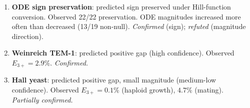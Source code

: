 \documentclass[10pt]{article}
\begin{document}
\begin{enumerate}
\item \textbf{ODE sign preservation}: predicted sign preserved under
  Hill-function conversion. Observed 22/22 preservation. ODE
  magnitudes increased more often than decreased (13/19 non-null).
  \emph{Confirmed} (sign); \emph{refuted} (magnitude direction).

\item \textbf{Weinreich TEM-1}: predicted positive gap (high
  confidence). Observed $E_{3+} = 2.9\%$. \emph{Confirmed.}

\item \textbf{Hall yeast}: predicted positive gap, small magnitude
  (medium-low confidence). Observed $E_{3+} = 0.1\%$ (haploid
  growth), $4.7\%$ (mating). \emph{Partially confirmed.}
\end{enumerate}
\end{document}
